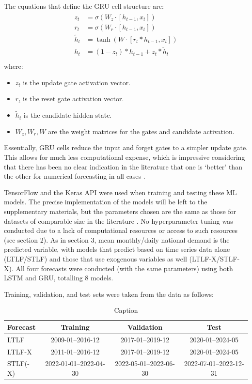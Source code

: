 \documentclass[12pt]{scrreprt}
\begin{document}
The equations that define the GRU cell structure are:
\begin{align}
    \begin{split}
        z_t &= \sigma(W_z \cdot [h_{t-1}, x_t]) \\
        r_t &= \sigma(W_r \cdot [h_{t-1}, x_t]) \\
        \tilde{h}_t &= \tanh(W \cdot [r_t \ast h_{t-1}, x_t]) \\
        h_t &= (1 - z_t) \ast h_{t-1} + z_t \ast \tilde{h}_t \\
    \end{split}
\end{align}
where:
\begin{itemize}
    \item $z_t$ is the update gate activation vector.
    \item $r_t$ is the reset gate activation vector.
    \item $\tilde{h}_t$ is the candidate hidden state.
    \item $W_z, W_r, W$ are the weight matrices for the gates and candidate activation.
\end{itemize}

Essentially, GRU cells reduce the input and forget gates to a simpler update gate. This allows for much less computational expense, which is impressive considering that there has been no clear indication in the literature that one is `better' than the other for numerical forecasting in all cases \cite{Korstanje21, Yin17, Olah15}.

TensorFlow and the Keras API were used when training and testing these ML models. The precise implementation of the models will be left to the supplementary materials, but the parameters chosen are the same as those for datasets of comparable size in the literature \cite{Korstanje21, Hogg101, Hogg102}. No hyperparameter tuning was conducted due to a lack of computational resources or access to such resources (see section 2). As in section 3, mean monthly/daily national demand is the predicted variable, with models that predict based on time series data alone (LTLF/STLF) and those that use exogenous variables as well (LTLF-X/STLF-X). All four forecasts were conducted (with the same parameters) using both LSTM and GRU, totalling 8 models.

Training, validation, and test sets were taken from the data as follows: 
\begin{table}[h]
    \centering
    \begin{tabular}{|l|c c c|}
        \hline
        Forecast & Training & Validation & Test  \\
        \hline
        LTLF & 2009-01--2016-12 & 2017-01--2019-12 & 2020-01--2024-05 \\
        \hline
        LTLF-X & 2011-01--2016-12 & 2017-01--2019-12 & 2020-01--2024-05 \\
        \hline
        STLF(-X) & 2022-01-01--2022-04-30 & 2022-05-01--2022-06-30 & 2022-07-01--2022-12-31\\
        \hline
    \end{tabular}
    \caption{Caption}
    \label{tab:train_val_test}
\end{table}
\end{document}
